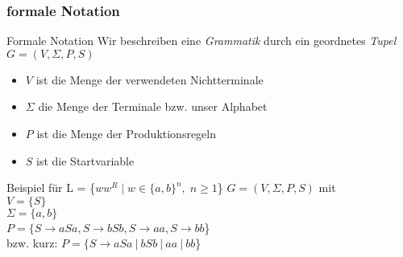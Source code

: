 %
%
%
%

\subsubsection{formale Notation}
\begin{frame}[fragile]{Formale Notation}
  Wir beschreiben eine \alert{\emph{Grammatik}} durch ein geordnetes \alert{\emph{Tupel}} $G = (V, \Sigma, P, S)$
  \begin{itemize}
    \item $V$ ist die Menge der verwendeten Nichtterminale
    \item $\Sigma$ die Menge der Terminale bzw. unser Alphabet
    \item $P$ ist die Menge der Produktionsregeln
    \item $S$ ist die Startvariable
  \end{itemize}
  \begin{exampleblock}{Beispiel für  L = \{$ww^R \mid w \in \{a, b\}^n, \; n \geq 1$\}}
    $G = (V,\Sigma,P,S)$ mit\\
    $V = \{S\}$\\
    $\Sigma = \{a,b\}$\\
    $P = \{S \rightarrow aSa, S \rightarrow bSb, S \rightarrow aa, S \rightarrow bb$\}\\
    \qquad bzw. kurz: $P = \{S \rightarrow aSa\ |\ bSb\ |\ aa\ |\ bb$\}
  \end{exampleblock}
\end{frame}

